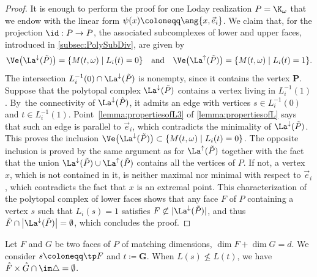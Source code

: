 \begin{proof}
It is enough to perform the proof for one Loday realization $P=\K_\omega$ that we endow with the linear form
$\psi(x)\coloneqq \ang{x, \vec e_i}$.
We claim that, for the projection $\id : P \to P$, the associated subcomplexes of lower and upper faces, introduced in \cref{subsec:PolySubDiv}, are given by
\[\Ve\big(\La^{\downarrow}(\tilde P)\big)=\{
M(t,\omega)\mid L_i(t)=0
\}
\quad
\text{and}
\quad
\Ve\big(\La^{\uparrow}(\tilde P)\big)=\{
M(t,\omega)\mid L_i(t)=1
\}.
\]
The intersection $L_i^{-1}(0)\cap \La^{\downarrow}(\tilde P)$
is nonempty, since it contains the vertex $\bm P$. Suppose that the polytopal complex
$\La^{\downarrow}(\tilde P)$ contains a vertex living in $L_i^{-1}(1)$. By~the connectivity of $\La^{\downarrow}(\tilde P)$, it admits an edge with vertices $s\in L_i^{-1}(0)$ and $t\in L_i^{-1}(1)$.
Point~\eqref{lemma:propertiesofL3} of \cref{lemma:propertiesofL} says that such an edge is parallel to $\vec e_i$, which contradicts the minimality of $\La^{\downarrow}(\tilde P)$.
This proves the inclusion
$\Ve\big(\La^{\downarrow}(\tilde P)\big)
\subset
\left\{
M(t,\omega)\mid L_i(t)=0
\right\}$.
The opposite inclusion is proved by the same argument as for
$\La^{\uparrow}(\tilde P)$
together with the fact that
the union $\La^{\downarrow}(\tilde P)\cup \La^{\uparrow}(\tilde P)$ contains all the vertices of $P$.
If not, a vertex~$x$, which is not contained in it, is neither maximal nor minimal with respect to $\vec e_i$, which contradicts the fact that $x$ is an extremal point.
This characterization of the polytopal complex of lower faces shows that any face $F$ of $P$ containing a vertex $s$ such that $L_i(s) = 1$ satisfies
$ F\not \subset\vert\La^{\downarrow}(\tilde P)\vert$, and thus
$\mathring F \cap \big\vert\La^{\downarrow}(\tilde P)\big\vert=\emptyset$, which concludes the proof.
\end{proof}

\begin{proposition}\label{prop:FirstExclusion}
Let $F$ and $G$ be two faces of $P$ of matching dimensions, \ie $\dim F+\dim G=d$. We consider
$s\coloneqq \tp F$ and $t\coloneqq \bm G$.
When $L(s)\not\leq L(t)$, we have $\mathring{F}\times \mathring{G}\cap \im\triangle = \emptyset$.
\end{proposition}

